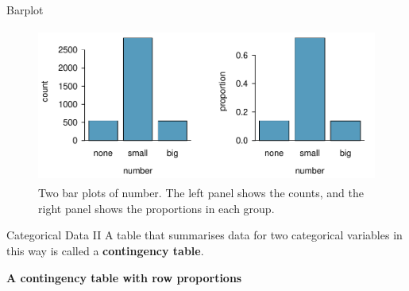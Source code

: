 \documentclass[12pt,a4paper]{beamer}
\begin{document}
\begin{frame}{Barplot}
	\begin{figure}[bht]
	   \centering
	   \includegraphics[height=2in]{figures/emailNumberBarPlot/emailNumberBarPlot}
	   \caption{Two bar plots of number. The left panel shows the counts, and the right panel shows the proportions in each group.}
	   \label{emailNumberBarPlot}
	\end{figure}
\end{frame}
\begin{frame}{Categorical Data II}
A table that 
	summarises data for two categorical variables in this way is called a \textbf{contingency table}.
	
	
	\begin{table}[ht]
	\centering
	\label{emailSpamNumberTableTotals}
	\end{table}
	
	\textbf{A contingency table with row proportions}
	\begin{table}[l]
	
	\end{table}

\end{frame}
\end{document}
